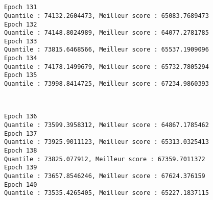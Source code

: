\documentclass[11pt]{article}
\begin{document}
    \begin{center}
    \end{center}
    { \hspace*{\fill} \\}
    
    \begin{center}
    \end{center}
    { \hspace*{\fill} \\}
    
    \begin{Verbatim}[commandchars=\\\{\}]
Epoch 131
Quantile : 74132.2604473, Meilleur score : 65083.7689473
Epoch 132
Quantile : 74148.8024989, Meilleur score : 64077.2781785
Epoch 133
Quantile : 73815.6468566, Meilleur score : 65537.1909096
Epoch 134
Quantile : 74178.1499679, Meilleur score : 65732.7805294
Epoch 135
Quantile : 73998.8414725, Meilleur score : 67234.9860393

    \end{Verbatim}

    \begin{center}
    \end{center}
    { \hspace*{\fill} \\}
    
    \begin{Verbatim}[commandchars=\\\{\}]
Epoch 136
Quantile : 73599.3958312, Meilleur score : 64867.1785462
Epoch 137
Quantile : 73925.9011123, Meilleur score : 65313.0325413
Epoch 138
Quantile : 73825.077912, Meilleur score : 67359.7011372
Epoch 139
Quantile : 73657.8546246, Meilleur score : 67624.376159
Epoch 140
Quantile : 73535.4265405, Meilleur score : 65227.1837115

    \end{Verbatim}

    \begin{center}
    \end{center}
    { \hspace*{\fill} \\}
    
    \begin{center}
    \end{center}
    { \hspace*{\fill} \\}
    
\end{document}
